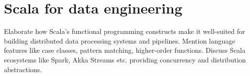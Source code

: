 \chapter{Scala for data engineering}

Elaborate how Scala's functional programming constructs make it well-suited for building distributed data processing systems and pipelines. Mention language features like case classes, pattern matching, higher-order functions. Discuss Scala ecosystems like Spark, Akka Streams etc. providing concurrency and distribution abstractions. 